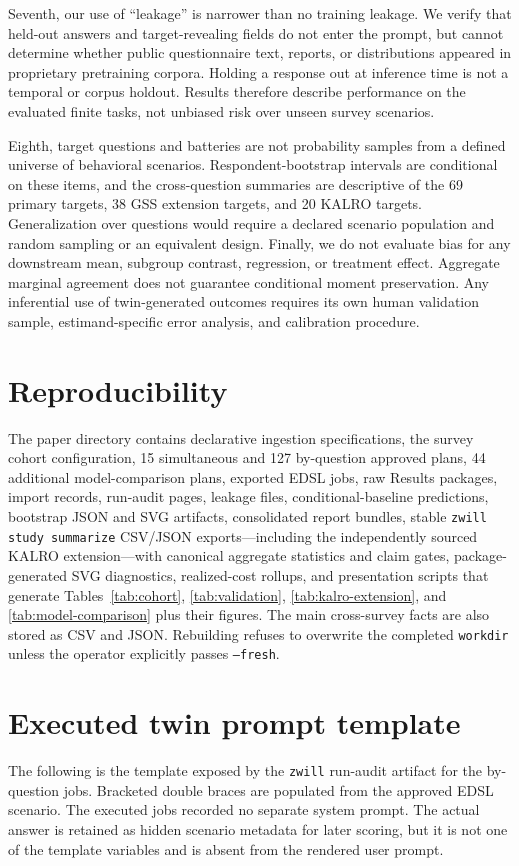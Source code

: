 \documentclass[11pt]{article}
\newcommand{\zwill}{\texttt{zwill}}
\begin{document}
Seventh, our use of ``leakage'' is narrower than no training leakage. We verify
that held-out answers and target-revealing fields do not enter the prompt, but
cannot determine whether public questionnaire text, reports, or distributions
appeared in proprietary pretraining corpora. Holding a response out at
inference time is not a temporal or corpus holdout. Results therefore describe
performance on the evaluated finite tasks, not unbiased risk over unseen survey
scenarios.

Eighth, target questions and batteries are not probability samples from a
defined universe of behavioral scenarios. Respondent-bootstrap intervals are
conditional on these items, and the cross-question summaries are descriptive
of the 69 primary targets, 38 GSS extension targets, and 20 KALRO targets.
Generalization over questions would require a declared
scenario population and random sampling or an equivalent design. Finally, we
do not evaluate bias for any downstream mean, subgroup contrast, regression,
or treatment effect. Aggregate marginal agreement does not guarantee
conditional moment preservation. Any inferential use of twin-generated
outcomes requires its own human validation sample, estimand-specific error
analysis, and calibration procedure.

\section{Reproducibility}
The paper directory contains declarative ingestion specifications, the survey
cohort configuration, 15 simultaneous and 127 by-question approved plans, 44 additional
model-comparison plans, exported EDSL jobs, raw Results packages,
import records, run-audit pages, leakage files, conditional-baseline
predictions, bootstrap JSON and SVG artifacts, consolidated report bundles,
stable \texttt{zwill study summarize} CSV/JSON exports---including the
independently sourced KALRO extension---with canonical
aggregate statistics and claim gates, package-generated SVG diagnostics,
realized-cost rollups, and presentation scripts that generate Tables~\ref{tab:cohort},
\ref{tab:validation}, \ref{tab:kalro-extension}, and
\ref{tab:model-comparison} plus their figures. The
main cross-survey facts are also stored as CSV and JSON. Rebuilding refuses to
overwrite the completed \texttt{workdir} unless
the operator explicitly passes \texttt{--fresh}.

\appendix
\section{Executed twin prompt template}
The following is the template exposed by the \zwill{} run-audit artifact for the
by-question jobs. Bracketed double braces are populated from the approved EDSL
scenario. The executed jobs recorded no separate system prompt. The actual
answer is retained as hidden scenario metadata for later scoring, but it is not
one of the template variables and is absent from the rendered user prompt.
\end{document}
